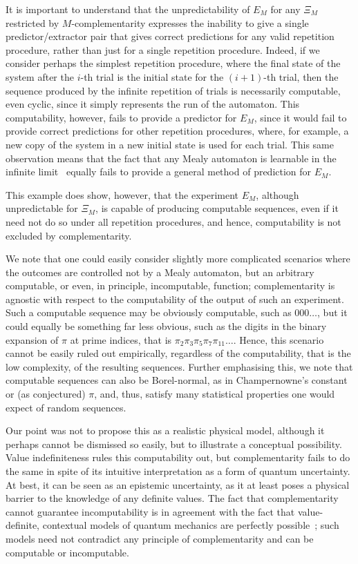 \documentclass[information,article,accept,moreauthors,pdftex,12pt,a4paper]{mdpi}
\theoremstyle{mdpi}
\newcounter{ex}
\newcounter{re}
\theoremstyle{mdpidefinition}
\begin{document}
It is important to understand that the unpredictability of $E_M$ for any $\Xi_M$ restricted by \mbox{$M$-complementarity} expresses the inability to give a single predictor/extractor pair that gives correct predictions for {any} valid repetition procedure, rather than just for a single repetition procedure.
Indeed, if we consider perhaps the simplest repetition procedure, where the final state of the system after the $i$-th trial is the initial state for the $(i+1)$-th trial, then the sequence produced by the infinite repetition of trials is necessarily computable, even cyclic, since it simply represents the run of the automaton.
This computability, however, fails to provide a predictor for $E_M$, since it would fail to provide correct predictions for other repetition procedures, where, for example, a new copy of the system in a new initial state is used for each trial.
This same observation means that the fact that any Mealy automaton is learnable in the infinite limit~\cite{Gold:1965qd} equally fails to provide a general method of prediction for $E_M$.

This example does show, however, that the experiment $E_M$, although unpredictable for $\Xi_M$, is capable of producing computable sequences, even if it need not do so under all repetition procedures, and hence, computability is not excluded by complementarity.

We note that one could easily consider slightly more complicated scenarios where the outcomes are controlled not by a Mealy automaton, but an arbitrary computable, or even, in principle, incomputable, function; complementarity is agnostic with respect to the computability of the output of such an experiment.
Such a computable sequence may be obviously computable, such as $000\dots$, but it could equally be something far less obvious, such as the digits in the binary expansion of $\pi$ at prime indices, that is $\pi_2\pi_3\pi_5\pi_7\pi_{11}\dots$.
Hence, this scenario cannot be easily ruled out empirically, regardless of the computability, that is the low complexity, of the resulting sequences.
Further emphasising this, we note that computable sequences can also be Borel-normal, as in Champernowne's constant or (as conjectured) $\pi$, and, thus, satisfy many statistical properties one would expect of random sequences.

Our point was not to propose this as a realistic physical model, although it perhaps cannot be dismissed so easily, but to illustrate a conceptual possibility.
Value indefiniteness rules this computability out, but complementarity fails to do the same in spite of its intuitive interpretation as a form of quantum uncertainty.
At best, it can be seen as an epistemic uncertainty, as it at least poses a physical barrier to the knowledge of any definite values.
The fact that complementarity cannot guarantee incomputability is in agreement with the fact that value-definite, {contextual} models of quantum mechanics are perfectly possible~\cite{DBLP:conf/birthday/AbbottCS15,Bohm52a,Bohm52b}; such models need not contradict any principle of complementarity and can be computable or incomputable.
\end{document}

